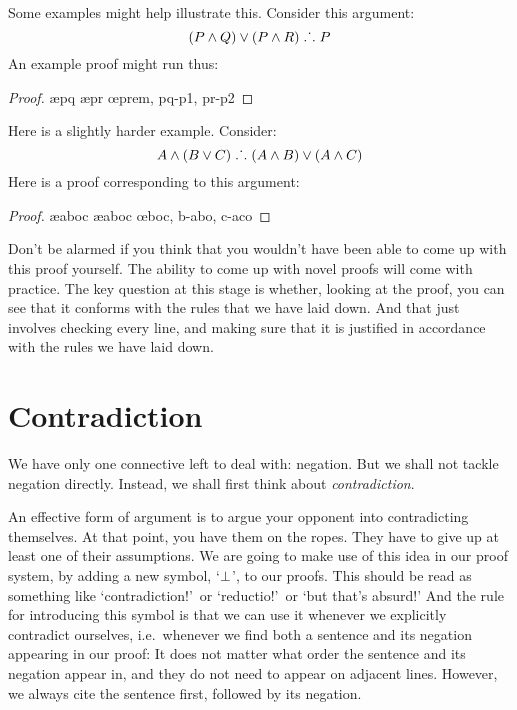 Some examples might help illustrate this. Consider this argument:
$$(P \wedge Q) \vee (P \wedge R) \mathrel{\ldotp\dot{}\,\ldotp} P$$
An example proof might run thus:
	\begin{proof}
			\open
				\ae{pq}
			\close
			\open
				\ae{pr}
			\close
		\oe{prem, pq-p1, pr-p2}
	\end{proof}
Here is a slightly harder example. Consider:
	$$ A \wedge (B \vee C) \mathrel{\ldotp\dot{}\,\ldotp} (A \wedge B) \vee (A \wedge C)$$
Here is a proof corresponding to this argument:
	\begin{proof}
		\ae{aboc}
		\ae{aboc}
		\open
		\close
		\open
		\close
	\oe{boc, b-abo, c-aco}
	\end{proof}
Don't be alarmed if you think that you wouldn't have been able to come up with this proof yourself. The ability to come up with novel proofs will come with practice. The key question at this stage is whether, looking at the proof, you can see that it conforms with the rules that we have laid down. And that just involves checking every line, and making sure that it is justified in accordance with the rules we have laid down.


\section{Contradiction}
We have only one connective left to deal with: negation. But we shall not tackle negation directly. Instead, we shall first think about \emph{contradiction}. 

An effective form of argument is to argue your opponent into contradicting themselves. At that point, you have them on the ropes. They have to give up at least one of their assumptions. We are going to make use of this idea in our proof system, by adding a new symbol, `$\bot$', to our proofs. This should be read as something like `contradiction!'\ or `reductio!'\ or `but that's absurd!'  And the rule for introducing this symbol is that we can use it whenever we explicitly contradict ourselves, i.e.\ whenever we find both a sentence and its negation appearing in our proof:
It does not matter what order the sentence and its negation appear in, and they do not need to appear on adjacent lines. However, we always cite the sentence first, followed by its negation. 

